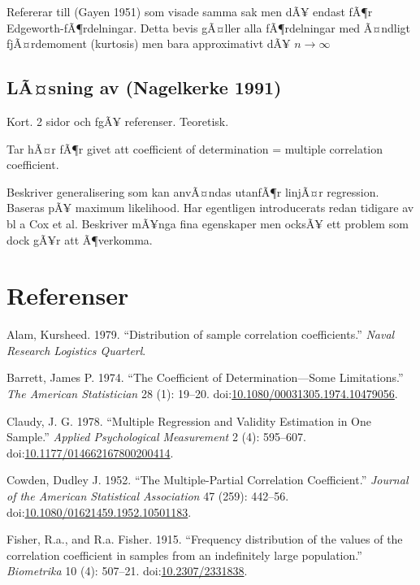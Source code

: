 \documentclass[]{article}
\begin{document}
Refererar till (Gayen 1951) som visade samma sak men dÃ¥ endast fÃ¶r
Edgeworth-fÃ¶rdelningar. Detta bevis gÃ¤ller alla fÃ¶rdelningar med
Ã¤ndligt fjÃ¤rdemoment (kurtosis) men bara approximativt dÃ¥
\(n \rightarrow \infty\)

\subsection{LÃ¤sning av (Nagelkerke
1991)}\label{lasning-av-nagelkerke1991}

Kort. 2 sidor och fgÃ¥ referenser. Teoretisk.

Tar hÃ¤r fÃ¶r givet att coefficient of determination = multiple
correlation coefficient.

Beskriver generalisering som kan anvÃ¤ndas utanfÃ¶r linjÃ¤r regression.
Baseras pÃ¥ maximum likelihood. Har egentligen introducerats redan
tidigare av bl a Cox et al. Beskriver mÃ¥nga fina egenskaper men ocksÃ¥
ett problem som dock gÃ¥r att Ã¶verkomma.

\section*{Referenser}\label{referenser}

\hypertarget{refs}{}
\hypertarget{ref-Alam1979}{}
Alam, Kursheed. 1979. ``Distribution of sample correlation
coefficients.'' \emph{Naval Research Logistics Quarterl}.

\hypertarget{ref-Barrett1974}{}
Barrett, James P. 1974. ``The Coefficient of Determination---Some
Limitations.'' \emph{The American Statistician} 28 (1): 19--20.
doi:\href{https://doi.org/10.1080/00031305.1974.10479056}{10.1080/00031305.1974.10479056}.

\hypertarget{ref-Claudy1978}{}
Claudy, J. G. 1978. ``Multiple Regression and Validity Estimation in One
Sample.'' \emph{Applied Psychological Measurement} 2 (4): 595--607.
doi:\href{https://doi.org/10.1177/014662167800200414}{10.1177/014662167800200414}.

\hypertarget{ref-Cowden1952}{}
Cowden, Dudley J. 1952. ``The Multiple-Partial Correlation
Coefficient.'' \emph{Journal of the American Statistical Association} 47
(259): 442--56.
doi:\href{https://doi.org/10.1080/01621459.1952.10501183}{10.1080/01621459.1952.10501183}.

\hypertarget{ref-Fisher1915}{}
Fisher, R.a., and R.a. Fisher. 1915. ``Frequency distribution of the
values of the correlation coefficient in samples from an indefinitely
large population.'' \emph{Biometrika} 10 (4): 507--21.
doi:\href{https://doi.org/10.2307/2331838}{10.2307/2331838}.
\end{document}
